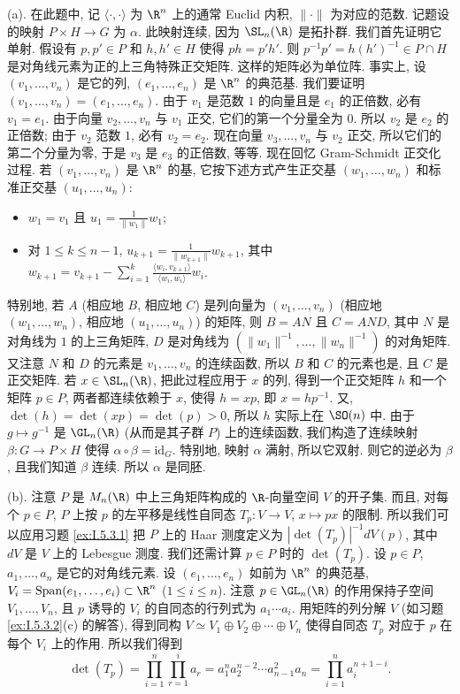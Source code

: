 \begin{solution}
(a). 在此题中, 记 $\langle \cdot, \cdot \rangle$ 为 $\R^n$ 上的通常 Euclid 内积, $\|\cdot\|$ 为对应的范数.
记题设的映射 $P \times H \to G$ 为 $\alpha$. 此映射连续, 因为 $\SL_n(\R)$ 是拓扑群. 我们首先证明它单射. 假设有 $p, p' \in P$ 和 $h, h' \in H$ 使得 $ph = p'h'$. 则 $p^{-1}p' = h(h')^{-1} \in P \cap H$ 是对角线元素为正的上三角特殊正交矩阵. 这样的矩阵必为单位阵. 事实上, 设 $(v_1, \ldots, v_n)$ 是它的列, $(e_1, \ldots, e_n)$ 是 $\R^n$ 的典范基. 我们要证明 $(v_1, \ldots, v_n) = (e_1, \ldots, e_n)$. 由于 $v_1$ 是范数 $1$ 的向量且是 $e_1$ 的正倍数, 必有 $v_1 = e_1$. 由于向量 $v_2, \ldots, v_n$ 与 $v_1$ 正交, 它们的第一个分量全为 $0$. 所以 $v_2$ 是 $e_2$ 的正倍数; 由于 $v_2$ 范数 $1$, 必有 $v_2 = e_2$. 现在向量 $v_3, \ldots, v_n$ 与 $v_2$ 正交, 所以它们的第二个分量为零, 于是 $v_3$ 是 $e_3$ 的正倍数, 等等.
现在回忆 Gram-Schmidt 正交化过程. 若 $(v_1, \ldots, v_n)$ 是 $\R^n$ 的基, 它按下述方式产生正交基 $(w_1, \ldots, w_n)$ 和标准正交基 $(u_1, \ldots, u_n)$:
\begin{itemize}
\item $w_1 = v_1$ 且 $u_1 = \frac{1}{\|w_1\|}w_1$;
\item 对 $1 \leq k \leq n - 1$, $u_{k+1} = \frac{1}{\|w_{k+1}\|}w_{k+1}$, 其中 $w_{k+1} = v_{k+1} - \sum_{i=1}^k\frac{\langle w_i, v_{k+1} \rangle}{\langle w_i, w_i \rangle}w_i$.
\end{itemize}
特别地, 若 $A$ (相应地 $B$, 相应地 $C$) 是列向量为 $(v_1, \ldots, v_n)$ (相应地 $(w_1, \ldots, w_n)$, 相应地 $(u_1, \ldots, u_n)$) 的矩阵, 则 $B = AN$ 且 $C = AND$, 其中 $N$ 是对角线为 $1$ 的上三角矩阵, $D$ 是对角线为 $(\|w_1\|^{-1}, \ldots, \|w_n\|^{-1})$ 的对角矩阵. 又注意 $N$ 和 $D$ 的元素是 $v_1, \ldots, v_n$ 的连续函数, 所以 $B$ 和 $C$ 的元素也是, 且 $C$ 是正交矩阵. 若 $x \in \SL_n(\R)$, 把此过程应用于 $x$ 的列, 得到一个正交矩阵 $h$ 和一个矩阵 $p \in P$, 两者都连续依赖于 $x$, 使得 $h = xp$, 即 $x = hp^{-1}$. 又, $\det(h) = \det(xp) = \det(p) > 0$, 所以 $h$ 实际上在 $\SO(n)$ 中. 由于 $g \longmapsto g^{-1}$ 是 $\GL_n(\R)$ (从而是其子群 $P$) 上的连续函数, 我们构造了连续映射 $\beta \colon G \to P \times H$ 使得 $\alpha \circ \beta = \mathrm{id}_G$. 特别地, 映射 $\alpha$ 满射, 所以它双射. 则它的逆必为 $\beta$, 且我们知道 $\beta$ 连续. 所以 $\alpha$ 是同胚.

(b). 注意 $P$ 是 $M_n(\R)$ 中上三角矩阵构成的 $\R$-向量空间 $V$ 的开子集. 而且, 对每个 $p \in P$, $P$ 上按 $p$ 的左平移是线性自同态 $T_p \colon V \to V$, $x \longmapsto px$ 的限制. 所以我们可以应用习题 \ref{ex:I.5.3.1} 把 $P$ 上的 Haar 测度定义为 $|\det(T_p)|^{-1}dV(p)$, 其中 $dV$ 是 $V$ 上的 Lebesgue 测度.
我们还需计算 $p \in P$ 时的 $\det(T_p)$. 设 $p \in P$, $a_1, \ldots, a_n$ 是它的对角线元素. 设 $(e_1, \ldots, e_n)$ 如前为 $\R^n$ 的典范基, $V_i = \operatorname{Span}(e_1, \ldots, e_i) \subset \R^n$ ($1 \leq i \leq n$). 注意 $p \in \GL_n(\R)$ 的作用保持子空间 $V_1, \ldots, V_n$, 且 $p$ 诱导的 $V_i$ 的自同态的行列式为 $a_1 \cdots a_i$. 用矩阵的列分解 $V$ (如习题 \ref{ex:I.5.3.2}(c) 的解答), 得到同构 $V \simeq V_1 \oplus V_2 \oplus \cdots \oplus V_n$ 使得自同态 $T_p$ 对应于 $p$ 在每个 $V_i$ 上的作用. 所以我们得到
\[
\det(T_p) = \prod_{i=1}^n\prod_{r=1}^i a_r = a_1^na_2^{n-2}\cdots a_{n-1}^2a_n = \prod_{i=1}^n a_i^{n+1-i}.
\]


\end{solution}
